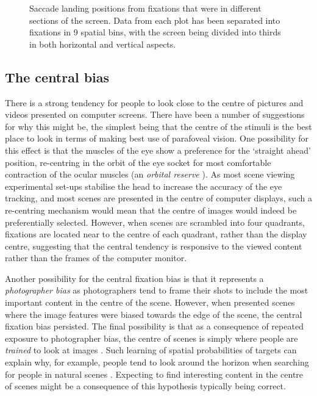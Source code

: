 \documentclass[a4paper, twocolumn, oneside, 10pt]{article}
\begin{document}
\begin{figure}[htb]
\caption{Saccade landing positions from fixations that were in different sections of the screen. Data from each plot has been separated into fixations in 9 spatial bins, with the screen being divided into thirds in both horizontal and vertical aspects.}
\label{fig:empiricalSaccadicFlow}
\end{figure}

\subsection{The central bias}
 
There is a strong tendency for people to look close to the centre of pictures \citep{tatler2007, tatler2005, canosa2003, clarke-tatler2014} and videos \citep{tseng2009,loschky2015} presented on computer screens. There have been a number of suggestions for why this might be, the simplest being that the centre of the stimuli is the best place to look in terms of making best use of parafoveal vision. One possibility for this effect is that the muscles of the eye show a preference for the `straight ahead' position, re-centring in the orbit of the eye socket for most comfortable contraction of the ocular muscles (an \emph{orbital reserve} \citep{fuller1996}). As most scene viewing experimental set-ups stabilise the head to increase the accuracy of the eye tracking, and most scenes are presented in the centre of computer displays, such a re-centring mechanism would mean that the centre of images would indeed be preferentially selected. However, when scenes are scrambled into four quadrants, fixations are located near to the centre of each quadrant, rather than the display centre, suggesting that the central tendency is responsive to the viewed content \citep{stainer2013} rather than the frames of the computer monitor.

Another possibility for the central fixation bias is that it represents a \emph{photographer bias} as photographers tend to frame their shots to include the most important content in the centre of the scene. However, when \cite{tatler2007} presented scenes where the image features were biased towards the edge of the scene, the central fixation bias persisted. The final possibility is that as a consequence of repeated exposure to photographer bias, the centre of scenes is simply where people are \emph{trained} to look at images \citep{parkhurst2002}. Such learning of spatial probabilities of targets can explain why, for example, people tend to look around the horizon when searching for people in natural scenes \citep{birmingham2009, torralba2006, ehinger2009}. Expecting to find interesting content in the centre of scenes might be a consequence of this hypothesis typically being correct. 
\end{document}
